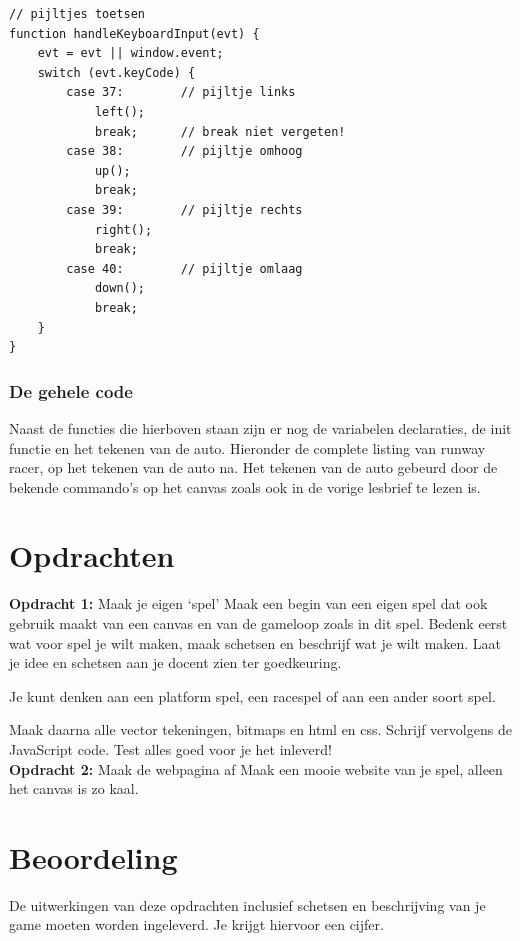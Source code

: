 \documentclass[a4paper]{report}
\begin{document}
\begin{lstlisting}[numbers=none]
// pijltjes toetsen
function handleKeyboardInput(evt) {
    evt = evt || window.event;
    switch (evt.keyCode) {
		case 37:		// pijltje links
			left();
			break;		// break niet vergeten!
		case 38:		// pijltje omhoog
			up();
			break;	
		case 39:		// pijltje rechts
			right();
			break;
		case 40:		// pijltje omlaag
			down();
			break;		
    }
}
\end{lstlisting}

\subsubsection*{De gehele code}
Naast de functies die hierboven staan zijn er nog de variabelen declaraties, de init functie en het tekenen van de auto. Hieronder de complete listing van runway racer, op het tekenen van de auto na. Het tekenen van de auto gebeurd door de bekende commando's op het canvas zoals ook in de vorige lesbrief te lezen is.


\clearpage

\section*{Opdrachten}

\noindent \textbf{Opdracht 1:} Maak je eigen `spel'
Maak een begin van een eigen spel dat ook gebruik maakt van een canvas en van de gameloop zoals in dit spel. Bedenk eerst wat voor spel je wilt maken, maak schetsen en beschrijf wat je wilt maken. Laat je idee en schetsen aan je docent zien ter goedkeuring.

Je kunt denken aan een platform spel, een racespel of aan een ander soort spel.

Maak daarna alle vector tekeningen, bitmaps en html en css. Schrijf vervolgens de JavaScript code. Test alles goed voor je het inleverd!
\\

\noindent \textbf{Opdracht 2:} Maak de webpagina af
Maak een mooie website van je spel, alleen het canvas is zo kaal.

\section*{Beoordeling}
De uitwerkingen van deze opdrachten inclusief schetsen en beschrijving van je game moeten worden ingeleverd. Je krijgt hiervoor een cijfer.
\end{document}
